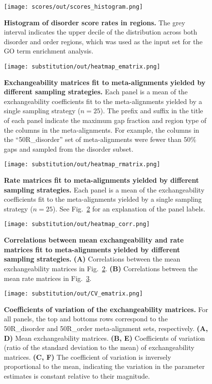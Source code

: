 \begin{figure}[h!]
\texttt{[image: scores/out/scores\_histogram.png]}
\centering
\caption{\textbf{Histogram of disorder score rates in regions.}
The grey interval indicates the upper decile of the distribution across both disorder and order regions, which was used as the input set for the GO term enrichment analysis.}
\label{sfig:scores_histogram}
\end{figure}

\begin{figure}[h!]
\texttt{[image: substitution/out/heatmap\_ematrix.png]}
\centering
\caption{\textbf{Exchangeability matrices fit to meta-alignments yielded by different sampling strategies.}
Each panel is a mean of the exchangeability coefficients fit to the meta-alignments yielded by a single sampling strategy ($n = 25$). The prefix and suffix in the title of each panel indicate the maximum gap fraction and region type of the columns in the meta-alignments. For example, the columns in the ``50R\_disorder'' set of meta-alignments were fewer than 50\% gaps and sampled from the disorder subset.}
\label{sfig:heatmap_ematrix}
\end{figure}

\begin{figure}[h!]
\texttt{[image: substitution/out/heatmap\_rmatrix.png]}
\centering
\caption{\textbf{Rate matrices fit to meta-alignments yielded by different sampling strategies.}
Each panel is a mean of the exchangeability coefficients fit to the meta-alignments yielded by a single sampling strategy ($n = 25$). See Fig.~\ref{sfig:heatmap_ematrix} for an explanation of the panel labels.}
\label{sfig:heatmap_rmatrix}
\end{figure}

\begin{figure}[h!]
\texttt{[image: substitution/out/heatmap\_corr.png]}
\centering
\caption{\textbf{Correlations between mean exchangeability and rate matrices fit to meta-alignments yielded by different sampling strategies.}
\textbf{(A)} Correlations between the mean exchangeability matrices in Fig.~\ref{sfig:heatmap_ematrix}. \textbf{(B)} Correlations between the mean rate matrices in Fig.~\ref{sfig:heatmap_rmatrix}.}
\label{sfig:heatmap_corr}
\end{figure}

\begin{figure}[h!]
\texttt{[image: substitution/out/CV\_ematrix.png]}
\centering
\caption{\textbf{Coefficients of variation of the exchangeability matrices.}
For all panels, the top and bottoms rows correspond to the 50R\_disorder and 50R\_order meta-alignment sets, respectively. \textbf{(A, D)} Mean exchangeability matrices. \textbf{(B, E)} Coefficients of variation (ratio of the standard deviation to the mean) of exchangeability matrices. \textbf{(C, F)} The coefficient of variation is inversely proportional to the mean, indicating the variation in the parameter estimates is constant relative to their magnitude.}
\label{sfig:CV_ematrix}
\end{figure}

